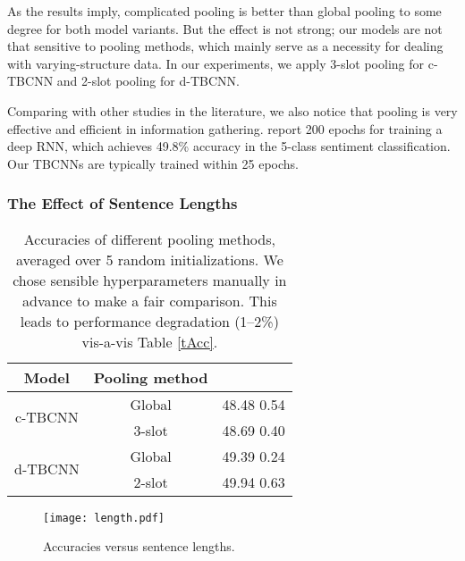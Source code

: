 \documentclass[11pt,a4paper]{article}
\begin{document}
As the results imply, complicated pooling is better than global pooling to some degree
for both model variants.
But the effect is not strong; our models are not that sensitive to pooling methods, which mainly serve as a necessity for dealing with varying-structure data.
In our experiments, we apply 3-slot pooling for c-TBCNN and 2-slot pooling for d-TBCNN.

Comparing with other studies in the literature, 
we also notice that pooling is very effective and efficient 
in information gathering. 
 report 200 epochs for training a deep RNN, which achieves
49.8\% accuracy in the 5-class sentiment classification.
Our TBCNNs are typically trained within 25 epochs.
 
\subsubsection{The Effect of Sentence Lengths}\label{sssLength}
\begin{table}[!t]
\centering
\small
\begin{tabular}{ccc}
\hline
\hline
\textbf{Model} & \textbf{Pooling method} & \text{\textbf{5-class accuracy (\%)}}\\
\hline
\multirow{2}{*}{c-TBCNN} & Global  & 48.48  0.54\\
        & 3-slot   & 48.69  0.40\\
\hline
\multirow{2}{*}{d-TBCNN} & Global  & 49.39  0.24\\
                         & 2-slot   & 49.94  0.63\\
\hline
\hline
\end{tabular}

\vspace{-.2cm}
\caption{Accuracies of different pooling methods, averaged over
5 random initializations.
We chose sensible hyperparameters
manually in advance to make a fair comparison.
This leads to performance degradation (1--2\%) vis-a-vis Table \ref{tAcc}.}\label{tPool}
\end{table}

\begin{figure}[!t]
\centering
\vspace{-.3cm}
\texttt{[image: length.pdf]}

\vspace{-.65cm}
\caption{Accuracies versus sentence lengths.}\label{fLength}
\vspace{-.5cm}
\end{figure}
\end{document}
